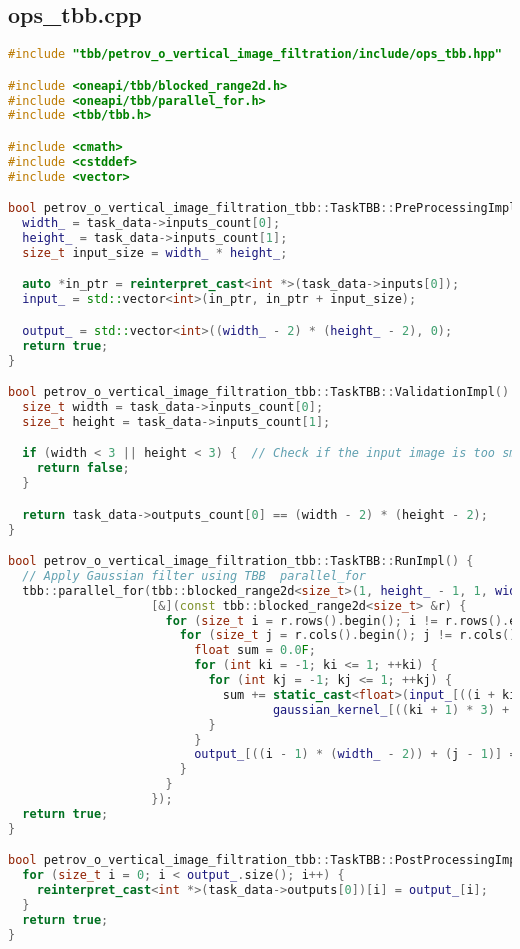 \documentclass[12pt,a4paper]{extarticle}
\begin{document}
\subsection{ops\_tbb.cpp}
\begin{lstlisting}[language=C++]
#include "tbb/petrov_o_vertical_image_filtration/include/ops_tbb.hpp"

#include <oneapi/tbb/blocked_range2d.h>
#include <oneapi/tbb/parallel_for.h>
#include <tbb/tbb.h>

#include <cmath>
#include <cstddef>
#include <vector>

bool petrov_o_vertical_image_filtration_tbb::TaskTBB::PreProcessingImpl() {
  width_ = task_data->inputs_count[0];
  height_ = task_data->inputs_count[1];
  size_t input_size = width_ * height_;

  auto *in_ptr = reinterpret_cast<int *>(task_data->inputs[0]);
  input_ = std::vector<int>(in_ptr, in_ptr + input_size);

  output_ = std::vector<int>((width_ - 2) * (height_ - 2), 0);
  return true;
}

bool petrov_o_vertical_image_filtration_tbb::TaskTBB::ValidationImpl() {
  size_t width = task_data->inputs_count[0];
  size_t height = task_data->inputs_count[1];

  if (width < 3 || height < 3) {  // Check if the input image is too small
    return false;
  }

  return task_data->outputs_count[0] == (width - 2) * (height - 2);
}

bool petrov_o_vertical_image_filtration_tbb::TaskTBB::RunImpl() {
  // Apply Gaussian filter using TBB  parallel_for
  tbb::parallel_for(tbb::blocked_range2d<size_t>(1, height_ - 1, 1, width_ - 1),
                    [&](const tbb::blocked_range2d<size_t> &r) {
                      for (size_t i = r.rows().begin(); i != r.rows().end(); ++i) {
                        for (size_t j = r.cols().begin(); j != r.cols().end(); ++j) {
                          float sum = 0.0F;
                          for (int ki = -1; ki <= 1; ++ki) {
                            for (int kj = -1; kj <= 1; ++kj) {
                              sum += static_cast<float>(input_[((i + ki) * width_) + (j + kj)]) *
                                     gaussian_kernel_[((ki + 1) * 3) + (kj + 1)];
                            }
                          }
                          output_[((i - 1) * (width_ - 2)) + (j - 1)] = static_cast<int>(sum);
                        }
                      }
                    });
  return true;
}

bool petrov_o_vertical_image_filtration_tbb::TaskTBB::PostProcessingImpl() {
  for (size_t i = 0; i < output_.size(); i++) {
    reinterpret_cast<int *>(task_data->outputs[0])[i] = output_[i];
  }
  return true;
}
\end{lstlisting}
\end{document}
